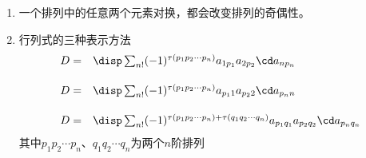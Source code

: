 \begin{frame}
\end{frame}


\begin{frame}
  
  \begin{enumerate}
    \item 
      一个排列中的任意两个元素对换，都会改变排列的奇偶性。\\[0.4cm]
    \item
      行列式的三种表示方法
      $$
      \begin{array}{rl}
        D = & \disp \sum_{n!} (-1)^{ \tau(p_1p_2\cdots p_n) } a_{1p_1}a_{2p_2}\cd a_{np_n} \\[0.5cm]
        D = & \disp \sum_{n!} (-1)^{ \tau(p_1p_2\cdots p_n) } a_{p_11}a_{p_22}\cd a_{p_nn} \\[0.5cm]
        D = & \disp \sum_{n!} (-1)^{ \tau(p_1p_2\cdots p_n) + \tau(q_1q_2\cdots q_n) } a_{p_1q_1}a_{p_2q_2}\cd a_{p_nq_n} 
      \end{array}
      $$
      其中$p_1p_2\cdots p_n$、$q_1q_2\cdots q_n$为两个$n$阶排列
    \end{enumerate}
\end{frame}
